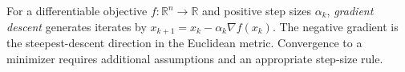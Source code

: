 
For a differentiable objective $f:\mathbb R^n\to\mathbb R$ and positive step sizes $\alpha_k$, \emph{gradient descent} generates iterates by $x_{k+1}=x_k-\alpha_k\nabla f(x_k)$. The negative gradient is the steepest-descent direction in the Euclidean metric. Convergence to a minimizer requires additional assumptions and an appropriate step-size rule.
